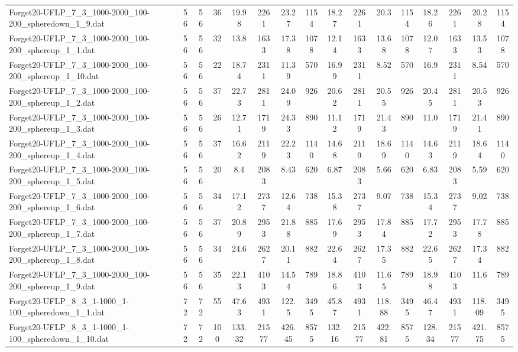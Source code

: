 \begin{sidewaystable}[!ht]
{\begin{tabular}{lccccccccccccccc}
Forget20-UFLP\_7\_3\_1000-2000\_100-200\_spheredown\_1\_9.dat & 56 & 56 & 36 & 19.98 & 2261 & 23.27 & 1154 & 18.27 & 2261 & 20.3 & 1154 & 18.26 & 2261 & 20.28 & 1154 \\
Forget20-UFLP\_7\_3\_1000-2000\_100-200\_sphereup\_1\_1.dat & 56 & 56 & 32 & 13.8 & 1633 & 17.38 & 1078 & 12.14 & 1633 & 13.68 & 1078 &  \textcolor{blue2}{12.07} & 1633 & 13.53 & 1078 \\
Forget20-UFLP\_7\_3\_1000-2000\_100-200\_sphereup\_1\_10.dat & 56 & 56 & 22 & 18.74 & 2311 & 11.39 & 570 & 16.99 & 2311 & 8.52 & 570 & 16.9 & 2311 & 8.54 & 570 \\
Forget20-UFLP\_7\_3\_1000-2000\_100-200\_sphereup\_1\_2.dat & 56 & 56 & 37 & 22.73 & 2811 & 24.09 & 926 & 20.62 & 2811 & 20.55 & 926 & 20.45 & 2811 & 20.53 & 926 \\
Forget20-UFLP\_7\_3\_1000-2000\_100-200\_sphereup\_1\_3.dat & 56 & 56 & 26 & 12.71 & 1719 & 24.33 & 890 & 11.12 & 1719 & 21.43 & 890 & 11.0 & 1719 & 21.41 & 890 \\
Forget20-UFLP\_7\_3\_1000-2000\_100-200\_sphereup\_1\_4.dat & 56 & 56 & 37 & 16.62 & 2119 & 22.23 & 1140 & 14.68 & 2119 & 18.69 & 1140 & 14.63 & 2119 & 18.64 & 1140 \\
Forget20-UFLP\_7\_3\_1000-2000\_100-200\_sphereup\_1\_5.dat & 56 & 56 & 20 & 8.4 & 2083 & 8.43 & 620 & 6.87 & 2083 & 5.66 & 620 & 6.83 & 2083 & 5.59 & 620 \\
Forget20-UFLP\_7\_3\_1000-2000\_100-200\_sphereup\_1\_6.dat & 56 & 56 & 34 & 17.12 & 2737 & 12.64 & 738 & 15.38 & 2737 & 9.07 & 738 & 15.34 & 2737 & 9.02 & 738 \\
Forget20-UFLP\_7\_3\_1000-2000\_100-200\_sphereup\_1\_7.dat & 56 & 56 & 37 & 20.89 & 2953 & 21.88 & 885 &  \textcolor{blue2}{17.69} & 2953 & 17.84 & 885 & 17.72 & 2953 & 17.78 & 885 \\
Forget20-UFLP\_7\_3\_1000-2000\_100-200\_sphereup\_1\_8.dat & 56 & 56 & 34 & 24.6 & 2627 & 20.11 & 882 & 22.64 & 2627 & 17.35 & 882 & 22.65 & 2627 & 17.34 & 882 \\
Forget20-UFLP\_7\_3\_1000-2000\_100-200\_sphereup\_1\_9.dat & 56 & 56 & 35 & 22.13 & 4103 & 14.54 & 789 & 18.86 & 4103 & 11.65 & 789 & 18.98 & 4103 & 11.6 & 789 \\
Forget20-UFLP\_8\_3\_1-1000\_1-100\_spheredown\_1\_1.dat & 72 & 72 & 55 & 47.63 & 4931 & 122.5 & 3495 & 45.87 & 4931 & 118.88 & 3495 & 46.47 & 4931 & 118.09 & 3495 \\
Forget20-UFLP\_8\_3\_1-1000\_1-100\_spheredown\_1\_10.dat & 72 & 72 & 100 & 133.32 & 21577 & 426.45 & 8575 & 132.16 & 21577 & 422.81 & 8575 &  \textcolor{blue2}{128.34} & 21577 & 421.75 & 8575 \\

\end{tabular}}
\end{sidewaystable}
